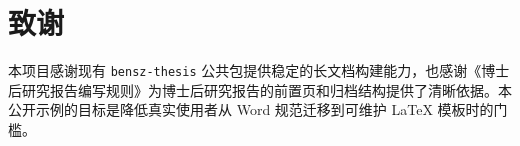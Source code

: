 \chapter*{致谢}

\noindent 本项目感谢现有 \texttt{bensz-thesis} 公共包提供稳定的长文档构建能力，也感谢《博士后研究报告编写规则》为博士后研究报告的前置页和归档结构提供了清晰依据。本公开示例的目标是降低真实使用者从 Word 规范迁移到可维护 LaTeX 模板时的门槛。
